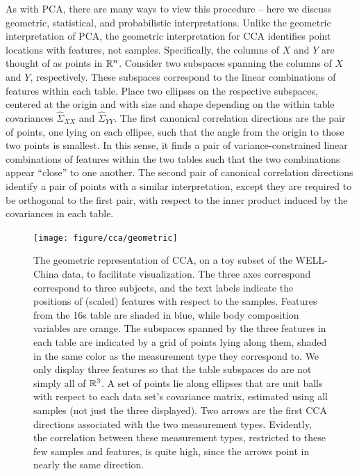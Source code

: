 \documentclass[14pt]{extarticle}
\begin{document}
As with PCA, there are many ways to view this procedure -- here we discuss
geometric, statistical, and probabilistic interpretations. Unlike the geometric
interpretation of PCA, the geometric interpretation for CCA identifies point
locations with features, not samples. Specifically, the columns of $X$ and $Y$
are thought of as points in $\mathbb{R}^{n}$. Consider two subspaces
spanning the columns of $X$ and $Y$, respectively. These subspaces correspond to
the linear combinations of features within each table. Place two ellipses on the
respective subspaces, centered at the origin and with size and shape depending
on the within table covariances $\hat{\Sigma}_{XX}$ and $\hat{\Sigma}_{YY}$. The
first canonical correlation directions are the pair of points, one lying on each
ellipse, such that the angle from the origin to those two points is smallest. In
this sense, it finds a pair of variance-constrained linear combinations of
features within the two tables such that the two combinations appear ``close'' to
one another. The second pair of canonical correlation directions identify a pair
of points with a similar interpretation, except they are required to be orthogonal
to the first pair, with respect to the inner product induced by the covariances
in each table.

\begin{figure}
  \centering
  \texttt{[image: figure/cca/geometric]}
  \caption{The geometric representation of CCA, on a toy subset of the WELL-China
    data, to facilitate visualization. The three axes correspond correspond to
    three subjects, and the text labels indicate the positions of (scaled) features with
    respect to the samples. Features from the 16s table are shaded in blue,
    while body composition variables are orange. The subspaces spanned by the
    three features in each table are indicated by a grid of points lying along
    them, shaded in the same color as the measurement type they correspond to.
    We only display three features so that the table subspaces do are not simply
    all of $\mathbb{R}^{3}$. A set of points lie along ellipses that are unit balls
    with respect to each data set's covariance matrix, estimated using all
    samples (not just the three displayed). Two arrows are the first CCA
    directions associated with the two measurement types. Evidently, the
    correlation between these measurement types, restricted to these few samples
    and features, is quite high, since the arrows point in nearly the same
    direction.
    \label{fig:cca_geometric} }
\end{figure}
\end{document}
